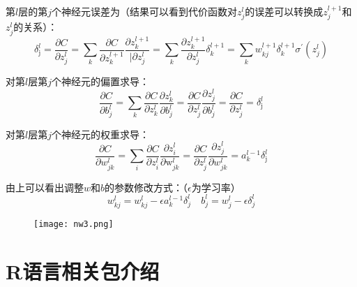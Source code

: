 \documentclass[cn]{elegantpaper}
\begin{document}
第$l$层的第$j$个神经元误差为（结果可以看到代价函数对$z_{j}^{l}$的误差可以转换成$z_{j}^{l+1}$和$z_{j}^{l}$的关系）：
\begin{equation}
\delta_{\mathrm{j}}^{l}=\frac{\partial C}{\partial z_{j}^{l}}=\sum_{k} \frac{\partial C}{\partial z_{k}^{l+1}} \frac{\partial z_{k}^{l+1}}{ | \partial z_{j}^{l}}=\sum_{k} \frac{\partial z_{k}^{l+1}}{\partial z_{j}^{l}} \delta_{k}^{l+1}=\sum_{k} w_{k j}^{l+1} \delta_{k}^{l+1} \sigma^{\prime}\left(z_{j}^{l}\right)
\end{equation}

对第$l$层第$j$个神经元的偏置求导：
\begin{equation}
\frac{\partial C}{\partial b_{j}^{l}}=\sum_{k} \frac{\partial C}{\partial z_{k}^{l}} \frac{\partial z_{k}^{l}}{\partial b_{j}^{l}}=\frac{\partial C}{\partial z_{j}^{l}} \frac{\partial z_{j}^{l}}{\partial b_{j}^{l}}=\frac{\partial C}{\partial z_{j}^{l}}=\delta_{\mathrm{j}}^{l}
\end{equation}

对第$l$层第$j$个神经元的权重求导：
\begin{equation}
\frac{\partial C}{\partial w_{j k}^{l}}=\sum_{i} \frac{\partial C}{\partial z_{i}^{l}} \frac{\partial z_{i}^{l}}{\partial \mathrm{w}_{j k}^{l}}=\frac{\partial C}{\partial z_{j}^{l}} \frac{\partial z_{j}^{l}}{\partial w_{j k}^{l}}=a_{k}^{l-1} \delta_{\mathrm{j}}^{l}
\end{equation}

由上可以看出调整$w$和$b$的参数修改方式：（$\epsilon$为学习率）
\begin{equation}
w_{k j}^{l}=w_{k j}^{l}-\epsilon a_{k}^{l-1} \delta_{j}^{l} \quad b_{j}^{l}=w_{j}^{l}-\epsilon \delta_{j}^{l}
\end{equation}
\begin{figure}[H]
	\centering
	\texttt{[image: nw3.png]}
\end{figure}


\section{R语言相关包介绍}
\end{document}
